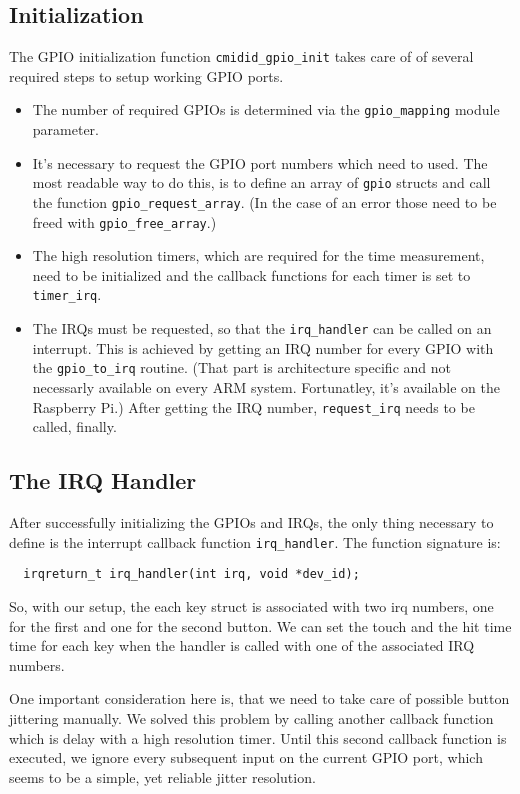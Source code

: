 \documentclass[paper=a4,fontsize=11pt,twocolumn,pagesize,bibtotoc]{scrartcl}
\begin{document}
\subsection{Initialization}
\label{gpios:init}

The GPIO initialization function \texttt{cmidid\_gpio\_init} takes care of of 
several required steps to setup working GPIO ports.

\begin{itemize}
  \item The number of required GPIOs is determined via the \texttt{gpio\_mapping}
    module parameter.
  \item It's necessary to request the GPIO port numbers which need to used.
    The most readable way to do this, is to define an array of \texttt{gpio}
    structs and call the function \texttt{gpio\_request\_array}. (In the case
    of an error those need to be freed with \texttt{gpio\_free\_array}.)
  \item The high resolution timers, which are required for the time 
    measurement, need to be initialized and the callback functions for each
    timer is set to \texttt{timer\_irq}.
  \item The IRQs must be requested, so that the \texttt{irq\_handler} can be 
    called on an interrupt. This is achieved by getting an IRQ number for 
    every GPIO with the \texttt{gpio\_to\_irq} routine. (That part is 
    architecture specific and not necessarly available on every ARM system.
    Fortunatley, it's available on the Raspberry Pi.) After getting the IRQ
    number, \texttt{request\_irq} needs to be called, finally.
\end{itemize}

\subsection{The IRQ Handler}
\label{gpios:irqhandler}

After successfully initializing the GPIOs and IRQs, the only thing necessary 
to define is the interrupt callback function \texttt{irq\_handler}. The function
signature is:
\begin{lstlisting}
  irqreturn_t irq_handler(int irq, void *dev_id);
\end{lstlisting}
So, with our setup, the each key struct is associated with two irq numbers, 
one for the first and one for the second button. We can set the touch and the 
hit time time for each key when the handler is called with one of the associated IRQ
numbers. 

One important consideration here is, that we need to take care of possible 
button jittering manually. We solved this problem by calling another callback
function which is delay with a high resolution timer. Until this second 
callback function is executed, we ignore every subsequent input on the 
current GPIO port, which seems to be a simple, yet reliable jitter resolution.
\end{document}

